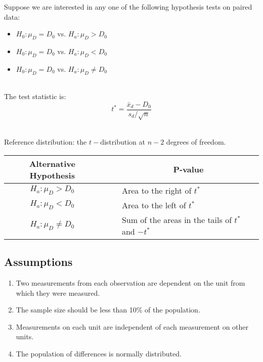 \begin{hyp}
Suppose we are interested in any one of the following hypothesis tests
on paired data:\\

\begin{itemize}
\item	$H_{0} : \mu_{D}  = D_{0}$  vs. $H_{a}  : \mu_{D}  > D_{0}$
\item	$H_{0} : \mu_{D}  = D_{0}$  vs. $H_{a}  : \mu_{D}  < D_{0}$
\item	$H_{0} : \mu_{D}  = D_{0}$  vs. $H_{a}  : \mu_{D}  \neq D_{0}$
\end{itemize}

\hfill\\
The test statistic is:
\begin{equation}
t^{*}	= \displaystyle\frac{ \bar{x}_{d} - D_{0} }{ s_{d} / \sqrt{n} }
\end{equation}

\hfill\\
Reference distribution: the $t-$distribution at $n - 2$ degrees of freedom.\\

\begin{center}
\begin{tabular}{ccl}
Alternative Hypothesis	&	~\quad~	&	\multicolumn{1}{c}{P-value}	\\
\hline
$H_{a}  : \mu_{D}  > D_{0}$		&	&	Area to the right of $t^{*}$	\\
$H_{a}  : \mu_{D}  < D_{0}$		&	&	Area to the left of $t^{*}$	\\
$H_{a}  : \mu_{D}  \neq D_{0}$	&	&	Sum of the areas in the tails of $t^{*}$ and $-t^{*}$
\end{tabular}
\end{center}

\end{hyp}




\subsection{Assumptions}

\begin{assumptions}
\begin{enumerate}
\item Two measurements from each observation are dependent on the unit from which they
were measured.
\item The sample size should be less than 10\% of the population.
\item Measurements on each unit are independent of each measurement on other units.
\item The population of differences is normally distributed.
\end{enumerate}
\end{assumptions}



